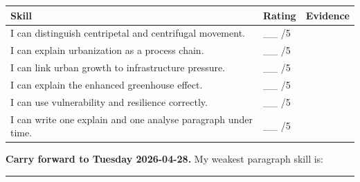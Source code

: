 \documentclass[11pt,a4paper]{article}
\begin{document}
\begin{tabularx}{\textwidth}{Y L{0.15\textwidth}Y}
\toprule
\textbf{Skill} & \textbf{Rating} & \textbf{Evidence} \\
\midrule
I can distinguish centripetal and centrifugal movement. & \_\_ /5 & \\
I can explain urbanization as a process chain. & \_\_ /5 & \\
I can link urban growth to infrastructure pressure. & \_\_ /5 & \\
I can explain the enhanced greenhouse effect. & \_\_ /5 & \\
I can use vulnerability and resilience correctly. & \_\_ /5 & \\
I can write one explain and one analyse paragraph under time. & \_\_ /5 & \\
\bottomrule
\end{tabularx}

\vspace{0.7em}

\noindent\colorbox{SoftGreen}{%
\begin{minipage}{0.965\textwidth}
\sffamily\raggedright
\textbf{\textcolor{HeadingBlue}{Carry forward to Tuesday 2026-04-28.}}
My weakest paragraph skill is:
\rule{0.52\textwidth}{0.4pt}
\end{minipage}
}
\end{document}
